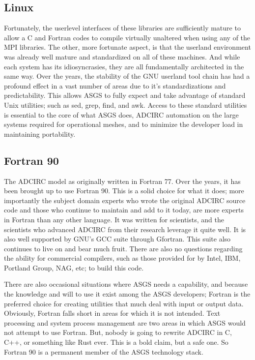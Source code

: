\documentclass{article}
\begin{document}
\subsection{Linux}

Fortunately, the userlevel interfaces of these libraries are sufficiently mature
to allow  a C and Fortran codes to compile virtually unaltered when using any of
the MPI libraries. The other, more fortunate aspect, is that the userland
environment was already well mature and standardized on all of these machines.
And while each system has its idiosyncrasies, they are all fundamentally
architected in the same way.  Over the years, the stability of the GNU userland
tool chain has had a profound effect in a vast number of areas due to it's
standardizations and predictability. This allows ASGS to fully expect and take
advantage of standard Unix utilities; such as sed, grep, find, and awk. Access
to these standard utilities is essential to the core of what ASGS does, ADCIRC
automation on the large systems required for operational meshes, and to minimize
the developer load in maintaining portability.

\subsection{Fortran 90}

The ADCIRC model as originally written in Fortran 77. Over the years, it has
been brought up to use Fortran 90. This is a solid choice for what it does; more
importantly the subject domain experts who wrote the original ADCIRC source code
and those who continue to maintain and add to it today, are more experts in
Fortran than any other language. It was written for scientists, and the
scientists who advanced ADCIRC from their research leverage it quite well. It is
also well supported by GNU's GCC suite through Gfortran. This suite also
continues to live on and bear much fruit. There are also no questions regarding
the ability for commercial compilers, such as those provided for by Intel, IBM,
Portland Group, NAG, etc; to build this code.

There are also occasional situations where ASGS needs a capability, and because
the knowledge and will to use it exist among the ASGS developers; Fortran is the
preferred choice for creating utilities that much deal with input or output
data. Obviously, Fortran falls short in areas for which it is not intended. Text
processing and system process management are two areas in which ASGS would not
attempt to use Fortran. But, nobody is going to rewrite ADCIRC in C, C++, or
something like Rust ever. This is a bold claim, but a safe one. So Fortran 90 is
a permanent member of the ASGS technology stack.
\end{document}
